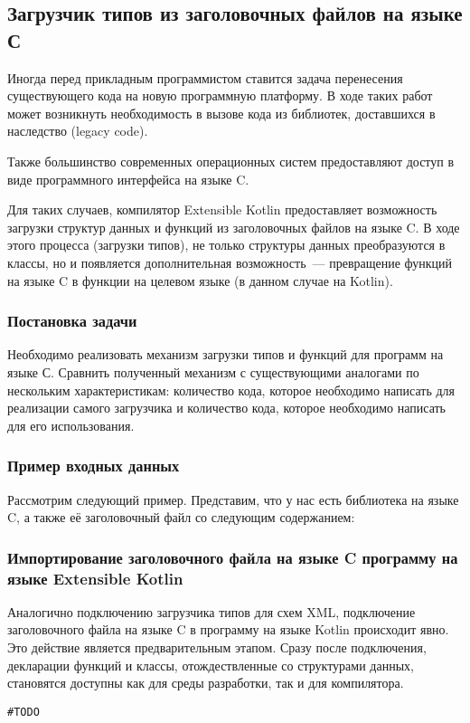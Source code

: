 \subsection{Загрузчик типов из заголовочных файлов на языке С}\label{c-loader}
Иногда перед прикладным программистом ставится задача перенесения существующего кода на новую программную платформу.
В ходе таких работ может возникнуть необходимость в вызове кода из библиотек, доставшихся в наследство (legacy code).

Также большинство современных операционных систем предоставляют доступ в виде программного интерфейса на языке C.

Для таких случаев, компилятор Extensible Kotlin предоставляет возможность загрузки структур данных и функций из заголовочных файлов на языке C.
В ходе этого процесса (загрузки типов), не только структуры данных преобразуются в классы, но и появляется дополнительная возможность~--- превращение функций на языке C в функции на целевом языке (в данном случае на Kotlin).

\subsubsection{Постановка задачи}
\td Необходимо реализовать механизм загрузки типов и функций для программ на языке С.
Сравнить полученный механизм с существующими аналогами по нескольким характеристикам: количество кода, которое необходимо написать для реализации самого загрузчика и количество кода, которое необходимо написать для его использования.

\subsubsection{Пример входных данных}
Рассмотрим следующий пример. Представим, что у нас есть библиотека на языке C, а также её заголовочный файл со следующим содержанием:
\begin{code}

\end{code}

\subsubsection{Импортирование заголовочного файла на языке C программу на языке Extensible Kotlin}
Аналогично подключению загрузчика типов для схем XML, подключение заголовочного файла на языке C в программу на языке Kotlin происходит явно.
Это действие является предварительным этапом. Сразу после подключения, декларации функций и классы, отождествленные со структурами данных, становятся доступны как для среды разработки, так и для компилятора.
\begin{code}\begin{lstlisting}[caption={Подключение заголовочного файла на языке C в программу на языке Kotlin.}, label={c-type-loading-extension-point}]
#TODO
\end{lstlisting}\end{code}

